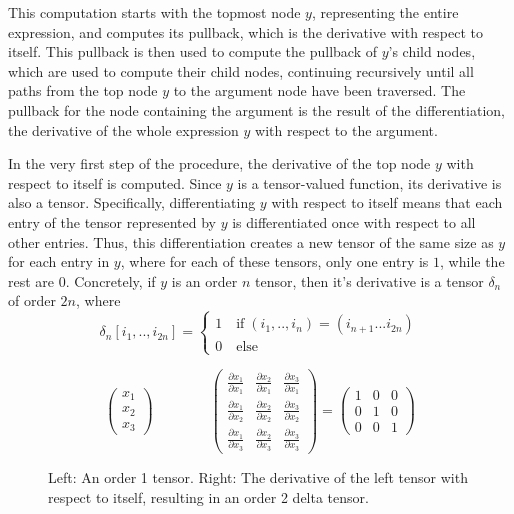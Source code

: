 \documentclass[12pt, a4paper]{report}
\begin{document}
This computation starts with the topmost node $y$, representing the entire expression, and computes its pullback, which is the derivative with respect to itself.
This pullback is then used to compute the pullback of $y$'s child nodes, which are used to compute their child nodes, continuing recursively until all paths from the top node $y$ to the argument node have been traversed.
The pullback for the node containing the argument is the result of the differentiation, the derivative of the whole expression $y$ with respect to the argument.

In the very first step of the procedure, the derivative of the top node $y$ with respect to itself is computed.
Since $y$ is a tensor-valued function, its derivative is also a tensor.
Specifically, differentiating $y$ with respect to itself means that each entry of the tensor represented by $y$ is differentiated once with respect to all other entries.
Thus, this differentiation creates a new tensor of the same size as $y$ for each entry in $y$, where for each of these tensors, only one entry is $1$, while the rest are $0$.
Concretely, if $y$ is an order $n$ tensor, then it's derivative is a tensor $\delta_n$ of order $2n$, where
\begin{equation}
    \delta_n[i_1,..,i_{2n}] = 
    \begin{cases}
        1 \quad \text{if} \; (i_1,..,i_n) = (i_{n+1}...i_{2n}) \\
        0 \quad \text{else}
    \end{cases}
    \label{eq:delta}
\end{equation}
\begin{figure}
    $$
    \begin{pmatrix}
        x_1\\
        x_2\\
        x_3
    \end{pmatrix} \quad \quad \quad \quad 
    \begin{pmatrix}
        \frac{\partial x_1}{\partial x_1} & \frac{\partial x_2}{\partial x_1} & \frac{\partial x_3}{\partial x_1} \\
        \frac{\partial x_1}{\partial x_2} & \frac{\partial x_2}{\partial x_2} & \frac{\partial x_3}{\partial x_2} \\
        \frac{\partial x_1}{\partial x_3} & \frac{\partial x_2}{\partial x_3} & \frac{\partial x_3}{\partial x_3}
    \end{pmatrix}
    =
    \begin{pmatrix}
        1 & 0 & 0 \\
        0 & 1 & 0 \\
        0 & 0 & 1
    \end{pmatrix}
    $$
    \caption{Left: An order 1 tensor. Right: The derivative of the left tensor with respect to itself, resulting in an order 2 delta tensor.}
\end{figure}
\end{document}

